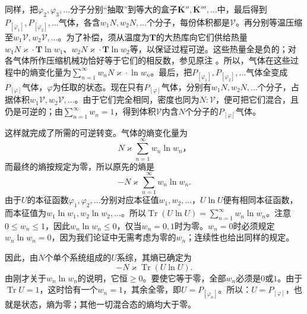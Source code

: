 \documentclass[fontsize=13pt,twoside,openany,headings=normal,parskip=false,bookmarkpackage=false,DIV=calc]{scrbook}
\begin{document}
同样，把$\varphi_2,\allowbreak \varphi_3,\allowbreak \ldots$分子分别“抽取”到等大的盒子$\overline{\boldsymbol{K}}'',\allowbreak \overline{\boldsymbol{K}}''',\allowbreak \ldots$中，最后得到$P_{[\varphi_1]},\allowbreak P_{[\varphi_2]},\allowbreak \ldots$气体，各含$w_1N,\allowbreak w_2N,\allowbreak \ldots$个分子，每份体积都是$\mathcal V$。再分别等温压缩至$w_1\mathcal V,\allowbreak w_2\mathcal V,\allowbreak \ldots$。为了补偿，须从温度为$\mathbf T$的大热库向它们供给热量$w_1N\varkappa\cdot\mathbf T\ln w_1$、$w_2N\varkappa\cdot\mathbf T\ln w_2$等，以保证过程可逆。这些热量全是负的；对各气体所作压缩机械功恰好等于它们的相反数，参见原注 \hyperlink{note-191}{}。所以，气体在这些过程中的熵变化量为$\sum_{n=1}^{\infty}w_nN\varkappa\cdot\ln w_n$。最后，把$P_{[\varphi_1]},\allowbreak P_{[\varphi_2]},\allowbreak \ldots$气体全变成$P_{[\varphi]}$气体，$\varphi$为任取的状态。现在只有$P_{[\varphi]}$气体，分别有$w_1N,\allowbreak w_2N,\allowbreak \ldots$个分子，占据体积$w_1\mathcal V,\allowbreak w_2\mathcal V,\allowbreak \ldots$。由于它们完全相同，密度也同为$N:\mathcal V$，便可把它们混合，且仍是可逆的；由$\sum_{n=1}^{\infty}w_n=1$，得到体积$\mathcal V$内含$N$个分子的$P_{[\varphi]}$气体。

这样就完成了所需的可逆转变。气体的熵变化量为
\[
N\varkappa\sum_{n=1}^{\infty}w_n\ln w_n\text{，}
\]
而最终的熵按规定为零，所以原先的熵是
\[
-N\varkappa\sum_{n=1}^{\infty}w_n\ln w_n.
\]
由于$U$的本征函数$\varphi_1,\allowbreak \varphi_2,\allowbreak \ldots$分别对应本征值$w_1,\allowbreak w_2,\allowbreak \ldots$，$U\ln U$便有相同本征函数，而本征值为$w_1\ln w_1,\allowbreak w_2\ln w_2,\allowbreak \ldots$。所以$\operatorname{Tr}(U\ln U)=\sum_{n=1}^{\infty}w_n\ln w_n$。注意$0\leq w_n\leq1$，因此$w_n\ln w_n\leq0$，仅当$w_n=0,\allowbreak 1$时为零。$w_n=0$时必须规定$w_n\ln w_n=0$，因为我们论证中无需考虑为零的$w_n$；连续性也给出同样的规定。

\hypertarget{origpage-202}{}\label{origpage-202}因此，由$N$个单个系统组成的$U$系综，其熵已确定为
\[
-N\varkappa\operatorname{Tr}(U\ln U).
\]
由刚才关于$w_n\ln w_n$的说明，它恒$\geq0$。要使它等于零，全部$w_n$必须是$0$或$1$。由于$\operatorname{Tr}U=1$，这时恰有一个$w_n=1$，其余全零，即$U=P_{[\varphi_n]}$。所以：$U=P_{[\varphi]}$，也就是状态，熵为零；其他一切混合态的熵均大于零。
\end{document}
